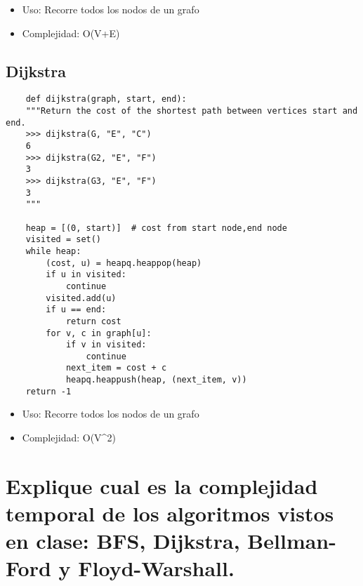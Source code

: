 \documentclass[a4paper]{article}
\begin{document}
\begin{itemize}
    \item Uso: Recorre todos los nodos de un grafo
    \item Complejidad: O(V+E)
    
\end{itemize}


\subsection{Dijkstra}
\begin{verbatim}
    def dijkstra(graph, start, end):
    """Return the cost of the shortest path between vertices start and end.
    >>> dijkstra(G, "E", "C")
    6
    >>> dijkstra(G2, "E", "F")
    3
    >>> dijkstra(G3, "E", "F")
    3
    """

    heap = [(0, start)]  # cost from start node,end node
    visited = set()
    while heap:
        (cost, u) = heapq.heappop(heap)
        if u in visited:
            continue
        visited.add(u)
        if u == end:
            return cost
        for v, c in graph[u]:
            if v in visited:
                continue
            next_item = cost + c
            heapq.heappush(heap, (next_item, v))
    return -1
\end{verbatim}

\begin{itemize}
    \item Uso: Recorre todos los nodos de un grafo
    \item Complejidad: O(V^2)
    
\end{itemize}


\section{Explique cual es la complejidad temporal de los algoritmos vistos en clase: BFS,
Dijkstra, Bellman-Ford y Floyd-Warshall.}

\end{document}

